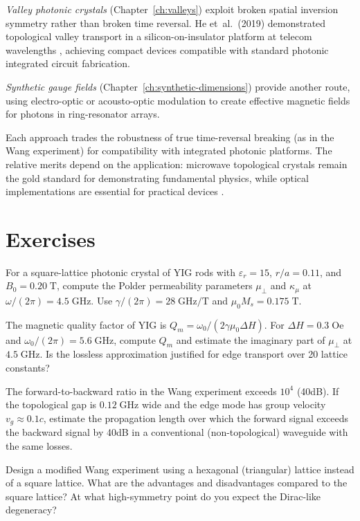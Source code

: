 \emph{Valley photonic crystals} (Chapter~\ref{ch:valleys}) exploit
broken spatial inversion symmetry rather than broken time reversal.
He et~al.\ (2019) demonstrated topological valley transport in a
silicon-on-insulator platform at telecom wavelengths
\cite{he2019silicon}, achieving compact devices compatible with
standard photonic integrated circuit fabrication.

\emph{Synthetic gauge fields} (Chapter~\ref{ch:synthetic-dimensions})
provide another route, using electro-optic or acousto-optic modulation
to create effective magnetic fields for photons in ring-resonator
arrays.

Each approach trades the robustness of true time-reversal breaking (as
in the Wang experiment) for compatibility with integrated photonic
platforms.  The relative merits depend on the application: microwave
topological crystals remain the gold standard for demonstrating
fundamental physics, while optical implementations are essential for
practical devices \cite{ozawa2018topological,price2022roadmap}.

\section*{Exercises}

\begin{exercise}
  For a square-lattice photonic crystal of YIG rods with $\varepsilon_r=15$,
  $r/a=0.11$, and $B_0=0.20\;\mathrm{T}$, compute the Polder permeability
  parameters $\mu_\perp$ and $\kappa_\mu$ at $\omega/(2\pi)=4.5\;\mathrm{GHz}$.
  Use $\gamma/(2\pi)=28\;\mathrm{GHz/T}$ and $\mu_0M_s=0.175\;\mathrm{T}$.
\end{exercise}

\begin{exercise}
  The magnetic quality factor of YIG is
  $Q_m=\omega_0/(2\gamma\mu_0\Delta H)$.  For $\Delta H=0.3\;\mathrm{Oe}$
  and $\omega_0/(2\pi)=5.6\;\mathrm{GHz}$, compute $Q_m$ and estimate
  the imaginary part of $\mu_\perp$ at $4.5\;\mathrm{GHz}$.  Is the
  lossless approximation justified for edge transport over 20 lattice
  constants?
\end{exercise}

\begin{exercise}
  The forward-to-backward ratio in the Wang experiment exceeds $10^4$
  (40\;dB).  If the topological gap is $0.12\;\mathrm{GHz}$ wide and
  the edge mode has group velocity $v_g\approx 0.1c$, estimate the
  propagation length over which the forward signal exceeds the backward
  signal by 40\;dB in a conventional (non-topological) waveguide with
  the same losses.
\end{exercise}

\begin{exercise}
  Design a modified Wang experiment using a hexagonal (triangular)
  lattice instead of a square lattice.  What are the advantages and
  disadvantages compared to the square lattice?  At what high-symmetry
  point do you expect the Dirac-like degeneracy?
\end{exercise}
